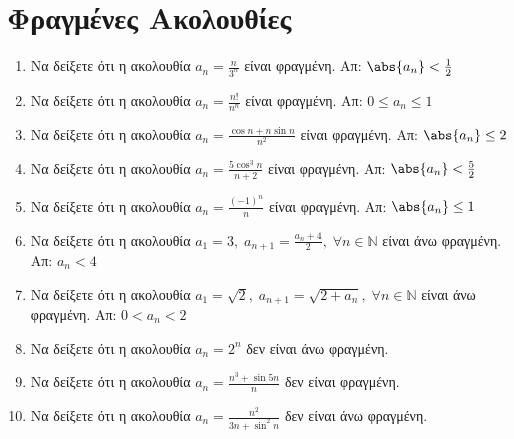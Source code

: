 


\everymath{\displaystyle}
\pagestyle{vangelis}



\begin{center}
  \minibox[c]{\large \bfseries \textcolor{Col1}{Ακολουθίες}\\ \large 
  \textcolor{Col1}{Ασκήσεις}}
\end{center}

\vspace{\baselineskip}


\setcounter{chapter}{1}
\section{Φραγμένες Ακολουθίες}

\begin{enumerate}
    \item Να δείξετε ότι η ακολουθία $ a_{n} = \frac{n}{3^{n}} $ είναι 
        φραγμένη. 
        \hfill Απ: $ \abs{a_{n}}< \frac{1}{2} $
    \item Να δείξετε ότι η ακολουθία $ a_{n} = \frac{n!}{n^{n}} $ είναι 
        φραγμένη. 
        \hfill Απ: $ 0 \leq a_{n} \leq 1 $ 
    \item Να δείξετε ότι η ακολουθία $ a_{n} = \frac{\cos{n} + n 
        \sin{n}}{n^{2}} $ είναι φραγμένη. 
        \hfill Απ: $ \abs{a_{n}} \leq 2 $ 
    \item Να δείξετε ότι η ακολουθία $ a_{n} = \frac{5 \cos^{3}{n}}{n+2} $ 
        είναι φραγμένη.
        \hfill Απ: $ \abs{a_{n}} < \frac{5}{2}  $ 
    \item Να δείξετε ότι η ακολουθία $ a_{n} = \frac{(-1)^{n}}{n} $ είναι 
        φραγμένη.
        \hfill Απ: $ \abs{a_{n}} \leq 1 $ 
    \item Να δείξετε ότι η ακολουθία $ a_{1} = 3, \; a_{n+1} =
        \frac{a_{n}+4}{2}, \; \forall n \in \mathbb{N} $ είναι άνω φραγμένη.
        \hfill Απ: $ a_{n} < 4 $ 
    \item Να δείξετε ότι η ακολουθία $ a_{1} = \sqrt{2}, \; a_{n+1} =
        \sqrt{2+ a_{n}}, \; \forall n \in \mathbb{N} $ είναι άνω φραγμένη.
        \hfill Απ: $ 0 < a_{n} < 2$ 
    \item Να δείξετε ότι η ακολουθία $ a_{n} = 2^{n} $ δεν είναι άνω 
        φραγμένη.
    \item Να δείξετε ότι η ακολουθία $ a_{n} = \frac{n^{3} + \sin{5n}}{n} $ δεν είναι 
        φραγμένη.
    \item Να δείξετε ότι η ακολουθία $ a_{n} = \frac{n^{2}}{3n+ \sin^{2}{n}} $ δεν 
        είναι άνω φραγμένη.
\end{enumerate}

